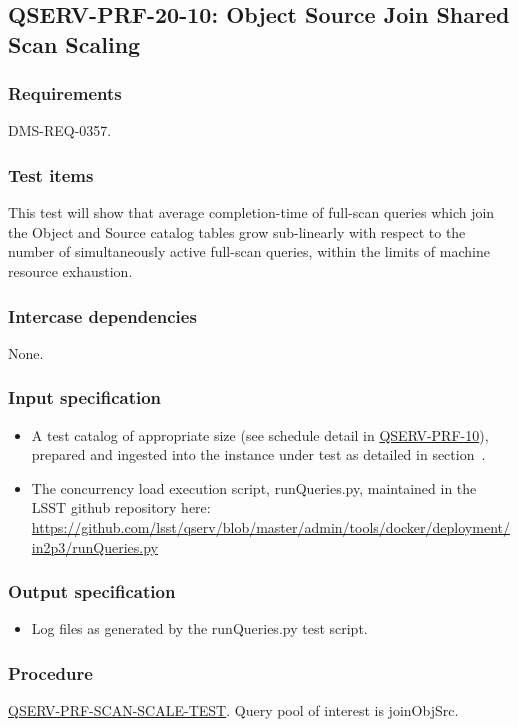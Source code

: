 \subsection{\textsc{QSERV-PRF-20-10}: Object Source Join Shared Scan Scaling}
\label{qserv-prf-20-10}

\subsubsection{Requirements}

DMS-REQ-0357.

\subsubsection{Test items}

This test will show that average completion-time of full-scan queries which join the Object and Source
catalog tables grow sub-linearly with respect to the number of simultaneously active full-scan queries, within
the limits of machine resource exhaustion.

\subsubsection{Intercase dependencies}

None.

\subsubsection{Input specification}

\begin{itemize}

  \item{A test catalog of appropriate size (see schedule detail in \hyperref[qserv-prf-10]{\textsc{
  QSERV-PRF-10}}), prepared and ingested into the \product{} instance under test as detailed in
  section~.}

  \item{The concurrency load execution script, runQueries.py, maintained in the LSST \product{}
  github repository here: \url{https://github.com/lsst/qserv/blob/master/admin/tools/docker/deployment/in2p3/runQueries.py}}

\end{itemize}

\subsubsection{Output specification}

\begin{itemize}
  \item{Log files as generated by the runQueries.py test script.}
\end{itemize}

\subsubsection{Procedure}

\hyperref[qserv-prf-scan-scale-test]{\textsc{QSERV-PRF-SCAN-SCALE-TEST}}.
Query pool of interest is joinObjSrc.
